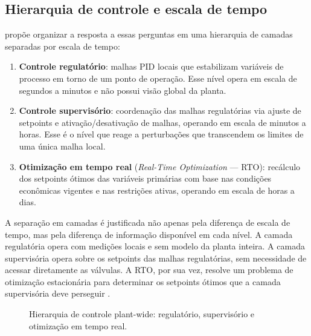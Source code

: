 \subsection{Hierarquia de controle e escala de tempo}

 propõe organizar a resposta a essas perguntas em uma hierarquia de
camadas separadas por escala de tempo:

\begin{enumerate}
	\item \textbf{Controle regulatório}: malhas PID locais que estabilizam variáveis de processo em
	      torno de um ponto de operação. Esse nível opera em escala de segundos a minutos e não possui
	      visão global da planta.
	\item \textbf{Controle supervisório}: coordenação das malhas regulatórias via ajuste de setpoints
	      e ativação/desativação de malhas, operando em escala de minutos a horas. Esse é o nível que
	      reage a perturbações que transcendem os limites de uma única malha local.
	\item \textbf{Otimização em tempo real} (\textit{Real-Time Optimization} --- RTO): recálculo dos
	      setpoints ótimos das variáveis primárias com base nas condições econômicas vigentes e nas
	      restrições ativas, operando em escala de horas a dias.
\end{enumerate}

A separação em camadas é justificada não apenas pela diferença de escala de tempo, mas pela
diferença de informação disponível em cada nível. A camada regulatória opera com medições locais e
sem modelo da planta inteira. A camada supervisória opera sobre os setpoints das malhas regulatórias,
sem necessidade de acessar diretamente as válvulas. A RTO, por sua vez, resolve um problema de
otimização estacionária para determinar os setpoints ótimos que a camada supervisória deve perseguir
\cite{Skogestad2004}.

\begin{figure}[htbp]
	\centering
	\caption{Hierarquia de controle plant-wide: regulatório, supervisório e otimização em tempo real.}
	\label{fig:plantwide_hierarchy}
\end{figure}

